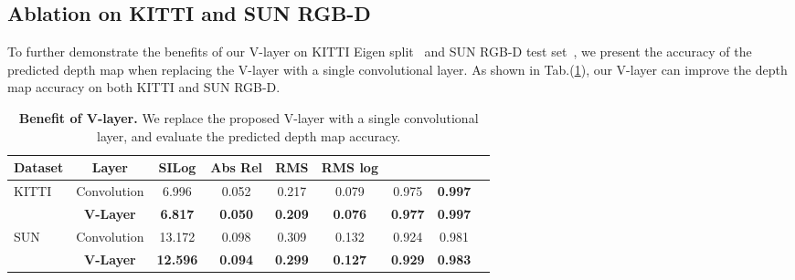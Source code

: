 \documentclass{article} \usepackage{iclr2023_conference, times}
\begin{document}
\subsection{Ablation on KITTI and SUN RGB-D}
To further demonstrate the benefits of our V-layer on KITTI Eigen split~\citep{geiger2012we, eigen2014depth} and SUN RGB-D test set~\citep{song2015sun}, we present the accuracy of the predicted depth map when replacing the V-layer with a single convolutional layer. As shown in Tab.(\ref{tab:app_abl}), our V-layer can improve the depth map accuracy on both KITTI and SUN RGB-D. 
\begin{table}[hbt]
\begin{center}
\scriptsize
\caption{\small \textbf{Benefit of V-layer.} We replace the proposed V-layer with a single convolutional layer, and evaluate the predicted depth map accuracy.}
\label{tab:app_abl}
\begin{tabular*}{1.0\textwidth}{l@{\extracolsep{\fill}}cccccccc}
\hline
Dataset & Layer & SILog  & Abs Rel & RMS & RMS log &    &  \\
\hline
\multirow{2}{*}{KITTI} & Convolution & 6.996 & 0.052 & 0.217 & 0.079 & 0.975 & \textbf{0.997}\\
& \textbf{V-Layer} & \textbf{6.817}  & \textbf{0.050} & \textbf{0.209} & \textbf{0.076} & \textbf{0.977} & \textbf{0.997}\\
\hline
\multirow{2}{*}{SUN} & Convolution & 13.172 & 0.098 & 0.309 & 0.132 & 0.924 & 0.981\\
& \textbf{V-Layer} & \textbf{12.596}  & \textbf{0.094} & \textbf{0.299} & \textbf{0.127} & \textbf{0.929} & \textbf{0.983}\\
\hline
\end{tabular*}
\end{center}
\end{table}
\end{document}
